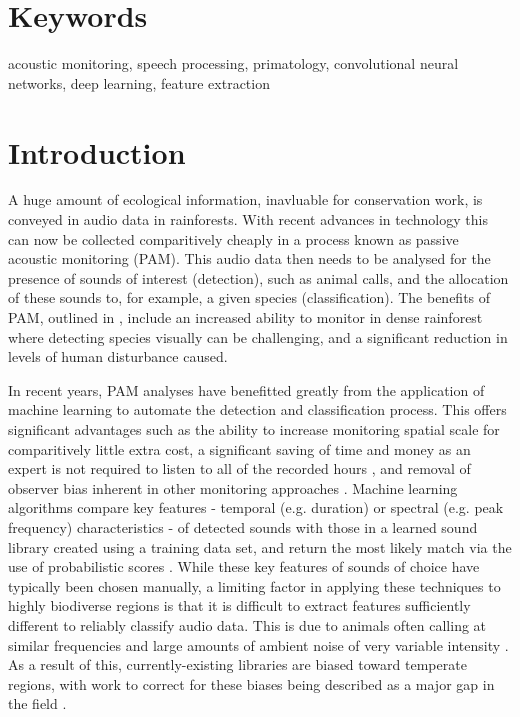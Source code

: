 \documentclass[11pt]{article}
\begin{document}
\linenumbers
\onehalfspacing

\section{Keywords}
acoustic monitoring, speech processing, primatology, convolutional neural networks, deep learning, feature extraction

\section{Introduction}

A huge amount of ecological information, inavluable for conservation work, is conveyed in audio data in rainforests. With recent advances in technology this can now be collected comparitively cheaply in a process known as passive acoustic monitoring (PAM). This audio data then needs to be analysed for the presence of sounds of interest (detection), such as animal calls, and the allocation of these sounds to, for example, a given species (classification). The benefits of PAM, outlined in \cite{heinicke2015assessing}, include an increased ability to monitor in dense rainforest where detecting species visually can be challenging, and a significant reduction in levels of human disturbance caused. 

In recent years, PAM analyses have benefitted greatly from the application of machine learning to automate the detection and classification process. This offers significant advantages such as the ability to increase monitoring spatial scale for comparitively little extra cost, a significant saving of time and money as an expert is not required to listen to all of the recorded hours \citep{heinicke2015assessing}, and removal of observer bias inherent in other monitoring approaches \citep{wrege2017acoustic}. Machine learning algorithms compare key features - temporal (e.g. duration) or spectral (e.g. peak frequency) characteristics - of detected sounds with those in a learned sound library created using a training data set, and return the most likely match via the use of probabilistic scores \citep{reason2016recommendations}. While these key features of sounds of choice have typically been chosen manually, a limiting factor in applying these techniques to highly biodiverse regions is that it is difficult to extract features sufficiently different to reliably classify audio data. This is due to animals often calling at similar frequencies \citep{slabbekoorn2004habitat} and large amounts of ambient noise of very variable intensity \citep{waser1977experimental}. As a result of this, currently-existing libraries are biased toward temperate regions, with work to correct for these biases being described as a major gap in the field \citep{browning2017passive}. 
\end{document}
